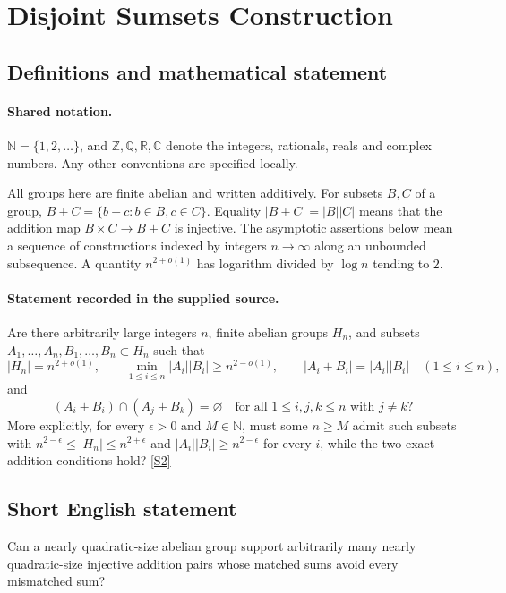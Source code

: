 \documentclass[11pt]{article}
\newcommand{\sref}[2]{\hyperlink{source:#1:#2}{[S#2]}}
\begin{document}
\section{Disjoint Sumsets Construction}\label{statement}

\subsection{Definitions and mathematical statement}

\paragraph{Shared notation.}$\mathbb N=\{1,2,\ldots\}$, and $\mathbb Z,\mathbb Q,\mathbb R,\mathbb C$ denote the integers, rationals, reals and complex numbers. Any other conventions are specified locally.


All groups here are finite abelian and written additively. For subsets $B,C$ of a group, $B+C=\{b+c:b\in B,c\in C\}$. Equality $|B+C|=|B||C|$ means that the addition map $B\times C\to B+C$ is injective. The asymptotic assertions below mean a sequence of constructions indexed by integers $n\to\infty$ along an unbounded subsequence. A quantity $n^{2+o(1)}$ has logarithm divided by $\log n$ tending to $2$.
\paragraph{Statement recorded in the supplied source.}
Are there arbitrarily large integers $n$, finite abelian groups $H_n$, and subsets $A_1,\ldots,A_n,B_1,\ldots,B_n\subset H_n$ such that
\[
 |H_n|=n^{2+o(1)},\qquad
 \min_{1\leq i\leq n}|A_i||B_i|\geq n^{2-o(1)},\qquad
 |A_i+B_i|=|A_i||B_i|\quad(1\leq i\leq n),
\]
and
\[
 (A_i+B_i)\cap(A_j+B_k)=\varnothing
 \quad\text{for all }1\leq i,j,k\leq n\text{ with }j\ne k?
\]
More explicitly, for every $\epsilon>0$ and $M\in\mathbb N$, must some $n\geq M$ admit such subsets with $n^{2-\epsilon}\leq|H_n|\leq n^{2+\epsilon}$ and $|A_i||B_i|\geq n^{2-\epsilon}$ for every $i$, while the two exact addition conditions hold? \sref{statement}{2}
\subsection{Short English statement}
Can a nearly quadratic-size abelian group support arbitrarily many nearly quadratic-size injective addition pairs whose matched sums avoid every mismatched sum?
\end{document}
